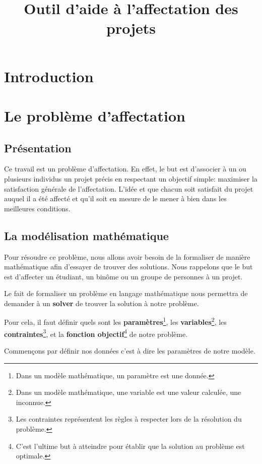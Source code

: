 \documentclass{polytech/polytech}
\title{Outil d'aide à l'affectation des projets}
\begin{document}

\chapter*{Introduction}
\label{chap:intro}

\chapter{Le problème d'affectation}
\label{chap:pb_affectation}

\section{Présentation}
\label{sec:pres_affectation}

Ce travail est un problème d'affectation.
En effet, le but est d'associer à un ou plusieurs individus un projet précis en respectant un objectif simple: maximiser la satisfaction générale de l'affectation.
L'idée et que chacun soit satisfait du projet auquel il a été affecté et qu'il soit en mesure de le mener à bien dans les meilleures conditions.


\section{La modélisation mathématique}
\label{sec:mod_math}

Pour résoudre ce problème, nous allons avoir besoin de la formaliser de manière mathématique afin d'essayer de trouver des solutions.
Nous rappelons que le but est d'affecter un étudiant, un binôme ou un groupe de personnes à un projet.

Le fait de formaliser un problème en langage mathématique nous permettra de demander à un \textbf{solver} de trouver la solution à notre problème.

Pour cela, il faut définir quels sont les \textbf{paramètres}\footnote{Dans un modèle mathématique, un paramètre est une donnée.}, les \textbf{ variables}\footnote{Dans un modèle mathématique, une variable est une valeur calculée, une inconnue.}, les \textbf{contraintes}\footnote{Les contraintes représentent les règles à respecter lors de la résolution du problème.}, et la \textbf{fonction objectif}\footnote{C'est l'ultime but à atteindre pour établir que la solution au problème est optimale.} de notre problème.

Commençons par définir nos données c'est à dire les paramètres de notre modèle.
\end{document}
